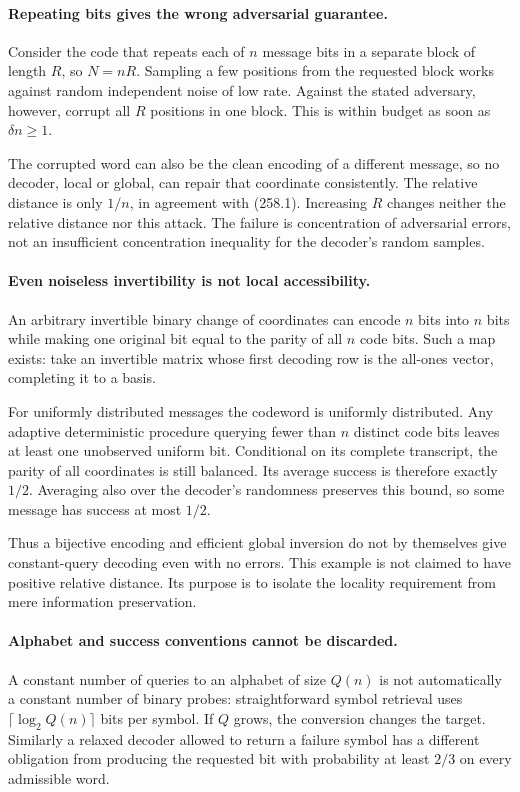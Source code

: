 \documentclass[11pt]{article}
\begin{document}
\paragraph{Repeating bits gives the wrong adversarial guarantee.}
Consider the code that repeats each of $n$ message bits in a separate block of length $R$, so $N=nR$. Sampling a few positions from the requested block works against random independent noise of low rate. Against the stated adversary, however, corrupt all $R$ positions in one block. This is within budget as soon as $\delta n\ge1$.

The corrupted word can also be the clean encoding of a different message, so no decoder, local or global, can repair that coordinate consistently. The relative distance is only $1/n$, in agreement with (258.1). Increasing $R$ changes neither the relative distance nor this attack. The failure is concentration of adversarial errors, not an insufficient concentration inequality for the decoder's random samples.

\paragraph{Even noiseless invertibility is not local accessibility.}
An arbitrary invertible binary change of coordinates can encode $n$ bits into $n$ bits while making one original bit equal to the parity of all $n$ code bits. Such a map exists: take an invertible matrix whose first decoding row is the all-ones vector, completing it to a basis.

For uniformly distributed messages the codeword is uniformly distributed. Any adaptive deterministic procedure querying fewer than $n$ distinct code bits leaves at least one unobserved uniform bit. Conditional on its complete transcript, the parity of all coordinates is still balanced. Its average success is therefore exactly $1/2$. Averaging also over the decoder's randomness preserves this bound, so some message has success at most $1/2$.

Thus a bijective encoding and efficient global inversion do not by themselves give constant-query decoding even with no errors. This example is not claimed to have positive relative distance. Its purpose is to isolate the locality requirement from mere information preservation.

\paragraph{Alphabet and success conventions cannot be discarded.}
A constant number of queries to an alphabet of size $Q(n)$ is not automatically a constant number of binary probes: straightforward symbol retrieval uses $\lceil\log_2Q(n)\rceil$ bits per symbol. If $Q$ grows, the conversion changes the target. Similarly a relaxed decoder allowed to return a failure symbol has a different obligation from producing the requested bit with probability at least $2/3$ on every admissible word.
\end{document}
